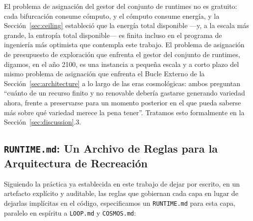 \documentclass[11pt]{article}
\begin{document}
El problema de asignación del gestor del conjunto de runtimes no es gratuito: cada bifurcación consume cómputo, y el cómputo consume energía, y la Sección~\ref{sec:ceiling} estableció que la energía total disponible —y, a la escala más grande, la entropía total disponible— es finita incluso en el programa de ingeniería más optimista que contempla este trabajo. El problema de asignación de presupuesto de exploración que enfrenta el gestor del conjunto de runtimes, digamos, en el año 2100, es una instancia a pequeña escala y a corto plazo del mismo problema de asignación que enfrenta el Bucle Externo de la Sección~\ref{sec:architecture} a lo largo de las eras cosmológicas: ambos preguntan ``cuánto de un recurso finito y no renovable debería gastarse generando variedad ahora, frente a preservarse para un momento posterior en el que pueda saberse más sobre qué variedad merece la pena tener''. Tratamos esto formalmente en la Sección~\ref{sec:discussion}.3.

\subsection{\texttt{RUNTIME.md}: Un Archivo de Reglas para la Arquitectura de Recreación}

Siguiendo la práctica ya establecida en este trabajo de dejar por escrito, en un artefacto explícito y auditable, las reglas que gobiernan cada capa en lugar de dejarlas implícitas en el código, especificamos un \texttt{RUNTIME.md} para esta capa, paralelo en espíritu a \texttt{LOOP.md} y \texttt{COSMOS.md}:
\end{document}
